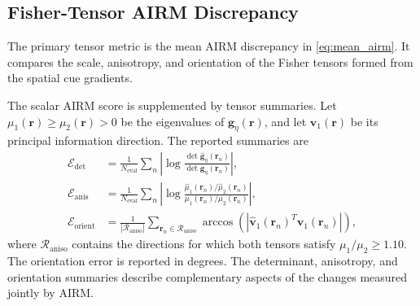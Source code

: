 \documentclass[journal]{IEEEtran}
\begin{document}
\subsection{Fisher-Tensor AIRM Discrepancy}
The primary tensor metric is the mean AIRM discrepancy in \eqref{eq:mean_airm}. It compares the scale, anisotropy, and orientation of the Fisher tensors formed from the spatial cue gradients.

The scalar AIRM score is supplemented by tensor summaries. Let \(\mu_1(\mathbf{r})\geq\mu_2(\mathbf{r})>0\) be the eigenvalues of \(\mathbf{g}_{\eta}(\mathbf{r})\), and let \(\mathbf{v}_1(\mathbf{r})\) be its principal information direction. The reported summaries are
\begin{align}
\mathcal{E}_{\mathrm{det}} &=
\frac{1}{N_{\mathrm{eval}}}\sum_n
\left|\log\frac{\det\widehat{\mathbf{g}}_{\eta}(\mathbf{r}_n)}
{\det\mathbf{g}_{\eta}(\mathbf{r}_n)}\right|, \\
\mathcal{E}_{\mathrm{anis}} &=
\frac{1}{N_{\mathrm{eval}}}\sum_n
\left|\log\frac{\hat{\mu}_1(\mathbf{r}_n)/\hat{\mu}_2(\mathbf{r}_n)}
{\mu_1(\mathbf{r}_n)/\mu_2(\mathbf{r}_n)}\right|, \\
\mathcal{E}_{\mathrm{orient}} &=
\frac{1}{|\mathcal{R}_{\mathrm{aniso}}|}
\sum_{\mathbf{r}_n\in\mathcal{R}_{\mathrm{aniso}}}
\arccos\left(
\left|\widehat{\mathbf{v}}_1(\mathbf{r}_n)^T\mathbf{v}_1(\mathbf{r}_n)\right|
\right),
\end{align}
where \(\mathcal{R}_{\mathrm{aniso}}\) contains the directions for which both tensors satisfy \(\mu_1/\mu_2 \geq 1.10\). The orientation error is reported in degrees. The determinant, anisotropy, and orientation summaries describe complementary aspects of the changes measured jointly by AIRM.
\end{document}

